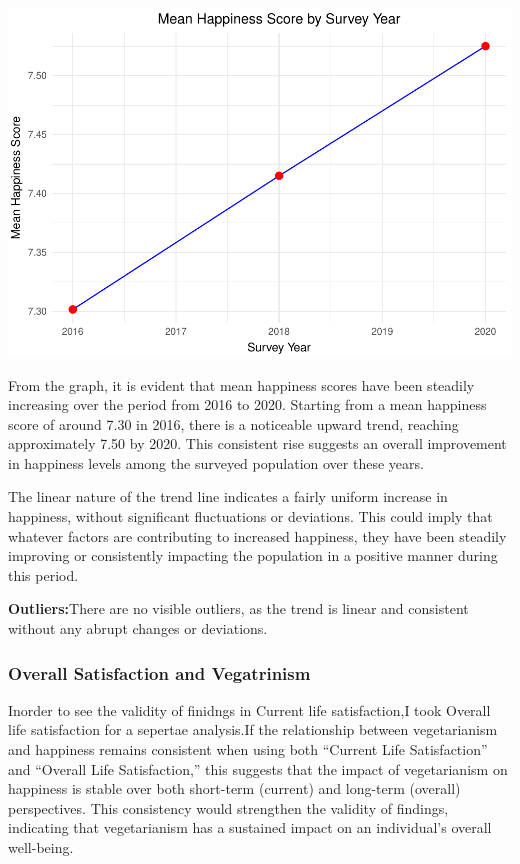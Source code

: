\documentclass[
]{article}
\begin{document}
\includegraphics{Final-v2_files/figure-latex/Survey yearanalysis-1.pdf}

From the graph, it is evident that mean happiness scores have been
steadily increasing over the period from 2016 to 2020. Starting from a
mean happiness score of around 7.30 in 2016, there is a noticeable
upward trend, reaching approximately 7.50 by 2020. This consistent rise
suggests an overall improvement in happiness levels among the surveyed
population over these years.

The linear nature of the trend line indicates a fairly uniform increase
in happiness, without significant fluctuations or deviations. This could
imply that whatever factors are contributing to increased happiness,
they have been steadily improving or consistently impacting the
population in a positive manner during this period.

\textbf{Outliers:}There are no visible outliers, as the trend is linear
and consistent without any abrupt changes or deviations.

\subsubsection{Overall Satisfaction and
Vegatrinism}\label{overall-satisfaction-and-vegatrinism}

Inorder to see the validity of finidngs in Current life satisfaction,I
took Overall life satisfaction for a sepertae analysis.If the
relationship between vegetarianism and happiness remains consistent when
using both ``Current Life Satisfaction'' and ``Overall Life
Satisfaction,'' this suggests that the impact of vegetarianism on
happiness is stable over both short-term (current) and long-term
(overall) perspectives. This consistency would strengthen the validity
of findings, indicating that vegetarianism has a sustained impact on an
individual's overall well-being.
\end{document}
